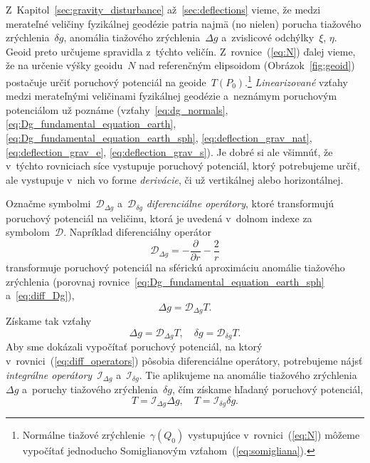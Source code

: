 \documentclass[a4paper, 12pt]{book}
\newcommand{\DIFF}{\mathcal D}
\newcommand{\INT}{\mathcal I}
\begin{document}
Z~Kapitol~\ref{sec:gravity_disturbance} až~\ref{sec:deflections} vieme, že 
medzi merateľné veličiny fyzikálnej geodézie patria najmä (no nielen) porucha 
tiažového zrýchlenia~$\delta g$, anomália tiažového zrýchlenia~$\Delta g$ 
a~zvislicové odchýlky~$\xi$, $\eta$.  Geoid preto určujeme spravidla z~týchto 
veličín.  Z~rovnice~(\ref{eq:N}) ďalej vieme, že na určenie výšky geoidu~$N$ 
nad referenčným elipsoidom (Obrázok~\ref{fig:geoid}) postačuje určiť poruchový 
potenciál na geoide~$T(P_0)$.\footnote{Normálne tiažové 
zrýchlenie~$\gamma(Q_0)$ vystupujúce v~rovnici~(\ref{eq:N}) môžeme vypočítať 
jednoducho Somiglianovým vzťahom~(\ref{eq:somigliana}).}  \emph{Linearizované} 
vzťahy medzi merateľnými veličinami fyzikálnej geodézie a~neznámym poruchovým 
potenciálom už poznáme (vzťahy~\ref{eq:dg_normals}, 
\ref{eq:Dg_fundamental_equation_earth}, 
\ref{eq:Dg_fundamental_equation_earth_sph}, \ref{eq:deflection_grav_nat}, 
\ref{eq:deflection_grav_e}, \ref{eq:deflection_grav_s}).  Je dobré si ale 
všimnúť, že v~týchto rovniciach síce vystupuje poruchový potenciál, ktorý 
potrebujeme určiť, ale vystupuje v~nich vo forme \emph{derivácie}, či už 
vertikálnej alebo horizontálnej.

Označme symbolmi~$\DIFF_{\Delta g}$ a~$\DIFF_{\delta g}$ \emph{diferenciálne 
operátory}, ktoré transformujú poruchový potenciál na veličinu, ktorá je 
uvedená v~dolnom indexe za symbolom~$\DIFF$.  Napríklad diferenciálny operátor
%
\begin{equation}
\label{eq:diff_Dg}
\DIFF_{\Delta g} = -\frac{\partial}{\partial r} - \frac{2}{r}
\end{equation}
%
transformuje poruchový potenciál na sférickú aproximáciu anomálie tiažového 
zrýchlenia (porovnaj rovnice~\ref{eq:Dg_fundamental_equation_earth_sph} 
a~\ref{eq:diff_Dg}),
%
\begin{equation}
\Delta g = \DIFF_{\Delta g} T{.}
\end{equation}
%
Získame tak vzťahy
%
\begin{equation}
\label{eq:diff_operators}
\Delta g = \DIFF_{\Delta g}T{,} \quad \delta g = \DIFF_{\delta g}T{.}
\end{equation}
%
Aby sme dokázali vypočítať poruchový potenciál, na ktorý 
v~rovnici~(\ref{eq:diff_operators}) pôsobia diferenciálne operátory, 
potrebujeme nájsť \emph{integrálne operátory}~$\INT_{\Delta g}$ a~$\INT_{\delta 
g}$.  Tie aplikujeme na anomálie tiažového zrýchlenia~$\Delta g$ a~poruchy 
tiažového zrýchlenia~$\delta g$, čím získame hľadaný poruchový potenciál,
%
\begin{equation}
\label{eq:int_operators}
T = \INT_{\Delta g} \Delta g{,} \quad T = \INT_{\delta g}\delta g{.}
\end{equation}
\end{document}
